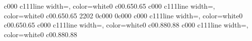 \documentclass{standalone}
\begin{document}
\begin{knitdiagram}
{c}{0}{0}{0}
{c}{1}{1}{1}{line width=\outlineThickness*\dx, color=white}{0}
{c}{0}{0.65}{0.65}
{c}{0}{0}{0}
{c}{1}{1}{1}{line width=\outlineThickness*\dx, color=white}{0}
{c}{0}{0.65}{0.65}
{2}{2}{0}{2}
{0}{c}{0}{0}{0}
{0}{c}{0}{0}{0}
{c}{0}{0}{0}
{c}{1}{1}{1}{line width=\outlineThickness*\dx, color=white}{0}
{c}{0}{0.65}{0.65}
{c}{0}{0}{0}
{c}{1}{1}{1}{line width=\outlineThickness*\dx, color=white}{0}
{c}{0}{0.88}{0.88}
{c}{0}{0}{0}
{c}{1}{1}{1}{line width=\outlineThickness*\dx, color=white}{0}
{c}{0}{0.88}{0.88}
\end{knitdiagram}
\end{document}

